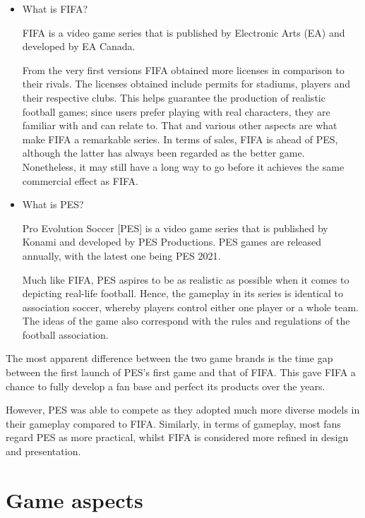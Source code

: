 \documentclass[12pt,twoside,english,a4paper]{article}
\begin{document}
\begin{itemize}
\item What is FIFA?

FIFA is a video game series that is published by Electronic Arts (EA) and developed by EA Canada.

From the very first versions FIFA obtained more licenses in comparison to their rivals. The licenses obtained include permits for stadiums, players and their respective clubs. This helps guarantee the production of realistic football games; since users prefer playing with real characters, they are familiar with and can relate to. That and various other aspects are what make FIFA a remarkable series. In terms of sales, FIFA is ahead of PES, although the latter has always been regarded as the better game. Nonetheless, it may still have a long way to go before it achieves the same commercial effect as FIFA.

\item What is PES?

Pro Evolution Soccer [PES] is a video game series that is published by Konami and developed by PES Productions. PES games are released annually, with the latest one being PES 2021. 

Much like FIFA, PES aspires to be as realistic as possible when it comes to depicting real-life football. Hence, the gameplay in its series is identical to association soccer, whereby players control either one player or a whole team. The ideas of the game also correspond with the rules and regulations of the football association.
	
\end{itemize}

The most apparent difference between the two game brands is the time gap between the first launch of PES’s first game and that of FIFA. This gave FIFA a chance to fully develop a fan base and perfect its products over the years. 

However, PES was able to compete as they adopted much more diverse models in their gameplay compared to FIFA. Similarly, in terms of gameplay, most fans regard PES as more practical, whilst FIFA is considered more refined in design and presentation. 




\section{Game aspects} \label{aspects}
\end{document}
